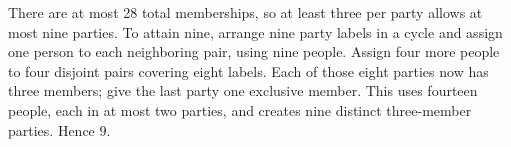 There are at most 28 total memberships, so at least three per party allows at most nine parties. To attain nine, arrange nine party labels in a cycle and assign one person to each neighboring pair, using nine people. Assign four more people to four disjoint pairs covering eight labels. Each of those eight parties now has three members; give the last party one exclusive member. This uses fourteen people, each in at most two parties, and creates nine distinct three-member parties. Hence $\boxed9$.
